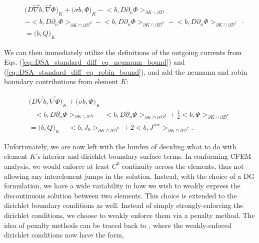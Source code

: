 \begin{equation}
\label{eq::SIP_diff_eq_weak_cellK_wbounds}
\begin{aligned}
&\Big(  D \vec{\nabla}  b , \vec{\nabla} \Phi  \Big)_{K}  + \Big(  \sigma   b ,  \Phi  \Big)_{K}   - \Big<  b, D \partial_n \Phi \Big>_{\partial K \backslash \partial \mathcal{D}}   \\
 &- \Big<  b, D \partial_n \Phi \Big>_{\partial	K \cap \partial \mathcal{D}^d} - \Big<  b, D \partial_n \Phi \Big>_{\partial	K \cap \partial \mathcal{D}^n}  - \Big<  b, D \partial_n \Phi \Big>_{\partial	K \cap \partial \mathcal{D}^r} \\
&= \Big(  b, Q  \Big)_{K} 
\end{aligned} .
\end{equation}

\noindent We can then immediately utilize the definitions of the outgoing currents from Eqs. (\ref{eq::DSA_standard_diff_eq_neumann_bound}) and (\ref{eq::DSA_standard_diff_eq_robin_bound}), and add the neumann and robin boundary contributions from element $K$:

\begin{equation}
\label{eq::SIP_diff_eq_weak_cellK_NR}
\begin{aligned}
\Big(  D \vec{\nabla}  b , \vec{\nabla} \Phi  \Big)_{K}  + \Big(  \sigma   b ,  \Phi  \Big)_{K}  \\
- \Big<  b, D \partial_n \Phi \Big>_{\partial K \backslash \partial \mathcal{D}} - \Big<  b, D \partial_n \Phi \Big>_{\partial	K \cap \partial \mathcal{D}^d}+ \frac{1}{2} \Big<  b, \Phi  \Big>_{\partial K \cap \partial \mathcal{D}^r} \\
= \Big(  b, Q  \Big)_{K} - \Big<   b, J_{0}  \Big>_{\partial K \cap \partial \mathcal{D}^n} +  2 \Big<  b, J^{inc}  \Big>_{\partial	K \cap \partial \mathcal{D}^r}.
\end{aligned}
\end{equation}

Unfortunately, we are now left with the burden of deciding what to do with element $K$'s interior and dirichlet boundary surface terms. In conforming CFEM analysis, we would enforce at least $C^0$ continuity across the elements, thus not allowing any interelement jumps in the solution. Instead, with the choice of a DG formulation, we have a wide variability in how we wish to weakly express the discontinuous solution between two elements. This choice is extended to the dirichlet boundary conditions as well. Instead of simply strongly-enforcing the dirichlet conditions, we choose to weakly enforce them via a penalty method. The idea of penalty methods can be traced back to \cite{lions2011problemes}, where the weakly-enfoced dirichlet conditions now have the form,


